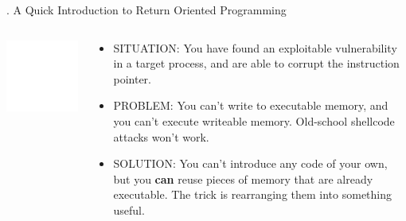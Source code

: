 \documentclass[9pt]{beamer}
\begin{document}
\begin{frame}{\theframenumber. A Quick Introduction to Return Oriented Programming}
  \begin{columns}
    \begin{column}{.4\textwidth}
      \includegraphics[width=\textwidth]{../images/macgyver-transparent.png}
    \end{column}
    \begin{column}{.6\textwidth}
      \begin{itemize}
      \item SITUATION: You have found an exploitable vulnerability in a target process, and are able to corrupt the instruction pointer.
        \item PROBLEM: You can't write to executable memory, and you can't execute writeable memory. Old-school shellcode attacks won't work. 
        \item SOLUTION: You can't introduce any code of your own, but you \textbf{can} reuse pieces of memory that are already executable. The trick is rearranging them into something useful.
      \end{itemize}
    \end{column}
    \end{columns}
\end{frame}
\end{document}
